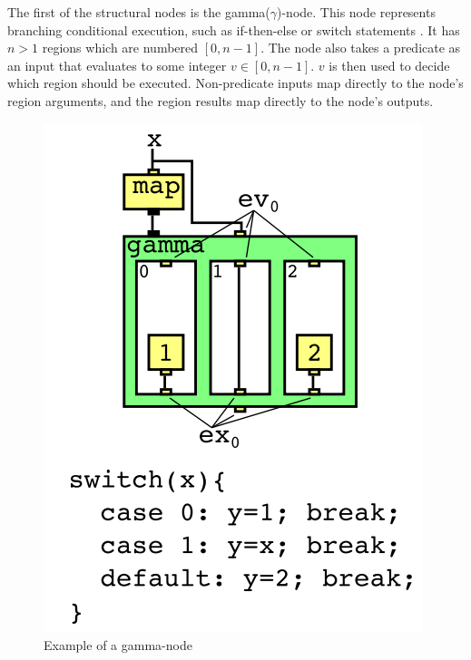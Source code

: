 \label{lbl:gamma-node}
The first of the structural nodes is the gamma($\gamma$)-node. This node represents branching conditional execution, such as if-then-else or switch statements \cite{Reissmann2020}. It has $n > 1$ regions which are numbered $[0, n-1]$. The node also takes a predicate as an input that evaluates to some integer $v \in [0, n-1]$. $v$ is then used to decide which region should be executed. Non-predicate inputs map directly to the node's region arguments, and the region results map directly to the node's outputs.
\begin{figure}[H]
    \centering
    \includegraphics[width=\textwidth/4]{Images/RVSDG_gamma_node.png}
    \caption{Example of a gamma-node \cite{Reissmann2020}}
    \label{fig:RVSDG_gamma_node}
\end{figure}


